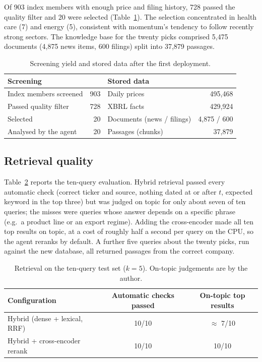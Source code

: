 \documentclass[preprint,11pt]{elsarticle}
\begin{document}
Of 903 index members with enough price and filing history, 728 passed the quality filter and 20 were
selected (Table~\ref{tab:data}). The selection concentrated in health care (7) and energy (5), consistent
with momentum's tendency to follow recently strong sectors. The knowledge base for the twenty picks
comprised 5{,}475 documents (4{,}875 news items, 600 filings) split into 37{,}879 passages.

\begin{table}[t]
\centering\small
\caption{Screening yield and stored data after the first deployment.}
\label{tab:data}
\begin{tabular}{@{}lr@{\qquad}lr@{}}
\toprule
Screening & & Stored data & \\
\midrule
Index members screened & 903 & Daily prices & 495{,}468 \\
Passed quality filter  & 728 & XBRL facts & 429{,}924 \\
Selected               & 20  & Documents (news / filings) & 4{,}875 / 600 \\
Analysed by the agent  & 20  & Passages (chunks) & 37{,}879 \\
\bottomrule
\end{tabular}
\end{table}

\subsection{Retrieval quality}

Table~\ref{tab:retrieval} reports the ten-query evaluation. Hybrid retrieval passed every automatic check
(correct ticker and source, nothing dated at or after $t$, expected keyword in the top three) but was judged
on topic for only about seven of ten queries; the misses were queries whose answer depends on a specific
phrase (e.g.\ a product line or an export regime). Adding the cross-encoder made all ten top results on topic,
at a cost of roughly half a second per query on the CPU, so the agent reranks by default. A further five
queries about the twenty picks, run against the new database, all returned passages from the correct company.

\begin{table}[t]
\centering\small
\caption{Retrieval on the ten-query test set ($k=5$). On-topic judgements are by the author.}
\label{tab:retrieval}
\begin{tabular}{@{}lcc@{}}
\toprule
Configuration & Automatic checks passed & On-topic top results \\
\midrule
Hybrid (dense + lexical, RRF) & 10/10 & $\approx$ 7/10 \\
Hybrid + cross-encoder rerank & 10/10 & 10/10 \\
\bottomrule
\end{tabular}
\end{table}
\end{document}
